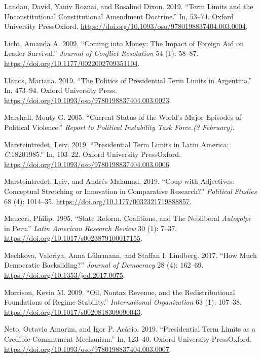 \documentclass[
  12pt,
]{report}
\newlength{\cslhangindent}
\newenvironment{CSLReferences}[2] %
 {\begin{list}{}{%
  \setlength{\itemindent}{0pt}
  \setlength{\leftmargin}{0pt}
  \setlength{\parsep}{0pt}
  \ifodd #1
   \setlength{\leftmargin}{\cslhangindent}
   \setlength{\itemindent}{-1\cslhangindent}
  \fi
  \setlength{\itemsep}{#2\baselineskip}}}
 {\end{list}}
\begin{document}
\begin{CSLReferences}{1}{0}
Landau, David, Yaniv Roznai, and Rosalind Dixon. 2019. {``Term Limits
and the Unconstitutional Constitutional Amendment Doctrine.''} In,
53--74. Oxford University PressOxford.
\url{https://doi.org/10.1093/oso/9780198837404.003.0004}.

Licht, Amanda A. 2009. {``Coming into Money: The Impact of Foreign Aid
on Leader Survival.''} \emph{Journal of Conflict Resolution} 54 (1):
58--87. \url{https://doi.org/10.1177/0022002709351104}.

Llanos, Mariana. 2019. {``The Politics of Presidential Term Limits in
Argentina.''} In, 473--94. Oxford University Press.
\url{https://doi.org/10.1093/oso/9780198837404.003.0023}.

Marshall, Monty G. 2005. {``Current Status of the World's Major Episodes
of Political Violence.''} \emph{Report to Political Instability Task
Force.(3 February)}.

Marsteintredet, Leiv. 2019. {``Presidential Term Limits in Latin
America: {\emph{C}}.1820{\textendash}1985.''} In, 103--22. Oxford
University PressOxford.
\url{https://doi.org/10.1093/oso/9780198837404.003.0006}.

Marsteintredet, Leiv, and Andrés Malamud. 2019. {``Coup with Adjectives:
Conceptual Stretching or Innovation in Comparative Research?''}
\emph{Political Studies} 68 (4): 1014--35.
\url{https://doi.org/10.1177/0032321719888857}.

Mauceri, Philip. 1995. {``State Reform, Coalitions, and The Neoliberal
{\emph{Autogolpe}} in Peru.''} \emph{Latin American Research Review} 30
(1): 7--37. \url{https://doi.org/10.1017/s0023879100017155}.

Mechkova, Valeriya, Anna Lührmann, and Staffan I. Lindberg. 2017. {``How
Much Democratic Backsliding?''} \emph{Journal of Democracy} 28 (4):
162--69. \url{https://doi.org/10.1353/jod.2017.0075}.

Morrison, Kevin M. 2009. {``Oil, Nontax Revenue, and the
Redistributional Foundations of Regime Stability.''} \emph{International
Organization} 63 (1): 107--38.
\url{https://doi.org/10.1017/s0020818309090043}.

Neto, Octavio Amorim, and Igor P. Acácio. 2019. {``Presidential Term
Limits as a Credible-Commitment Mechanism.''} In, 123--40. Oxford
University PressOxford.
\url{https://doi.org/10.1093/oso/9780198837404.003.0007}.


\end{CSLReferences}
\end{document}

